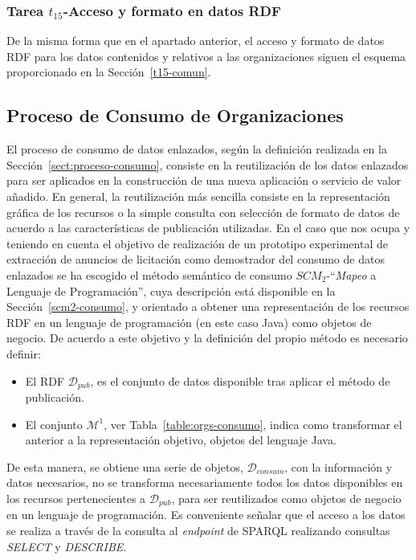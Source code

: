 \newpage

\subsubsection{Tarea $t_{15}$-Acceso y formato en datos RDF}
De la misma forma que en el apartado anterior, el acceso y formato de datos \gls{RDF} para los datos contenidos y relativos 
a las organizaciones siguen el esquema proporcionado en la Sección~\ref{t15-comun}.

\subsection{Proceso de Consumo de Organizaciones}
El proceso de consumo de datos enlazados, según la definición realizada en la Sección~\ref{sect:proceso-consumo}, consiste en 
la reutilización de los datos enlazados para ser aplicados en la construcción de una nueva aplicación o servicio de valor 
añadido. En general, la reutilización más sencilla consiste en la representación gráfica de los recursos o la simple 
consulta con selección de formato de datos de acuerdo a las características de publicación utilizadas. En el caso 
que nos ocupa y teniendo en cuenta el objetivo de realización de un prototipo experimental de extracción de anuncios 
de licitación como demostrador del consumo de datos enlazados se ha escogido el método semántico de consumo $SCM_2$-``\textit{Mapeo} a Lenguaje de Programación'', 
cuya descripción está disponible en la Sección~\ref{scm2-consumo}, y orientado a obtener una representación de los recursos RDF en un 
lenguaje de programación (en este caso Java) como objetos de negocio. De acuerdo a este objetivo y la definición del propio método 
es necesario definir:
\begin{itemize}
 \item El \dataset RDF $\mathcal{D}_{pub}$, es el conjunto de datos disponible tras aplicar el método de publicación.
 \item El conjunto $\mathcal{M}^1$, ver Tabla~\ref{table:orgs-consumo}, indica como transformar el \dataset anterior a la representación objetivo, objetos del lenguaje Java.
\end{itemize}

De esta manera, se obtiene una serie de objetos, $\mathcal{D}_{consum}$, con la información y datos necesarios, no se transforma necesariamente todos los datos disponibles en los recursos pertenecientes 
a  $\mathcal{D}_{pub}$, para ser reutilizados como objetos de negocio en un lenguaje de programación. Es conveniente señalar que el acceso a los datos se realiza a través 
de la consulta al \textit{endpoint} de \gls{SPARQL} realizando consultas \textit{SELECT} y \textit{DESCRIBE}.

